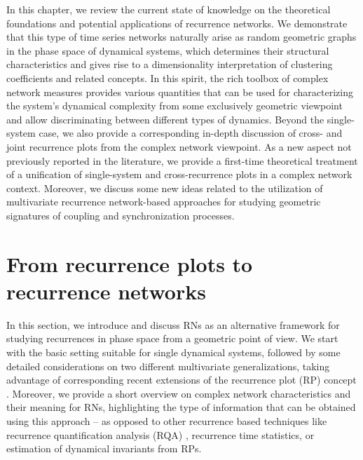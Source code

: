 \documentclass[graybox]{svmult}
\begin{document}
In this chapter, we review the current state of knowledge on the theoretical foundations and potential applications of recurrence networks. We demonstrate that this type of time series networks naturally arise as random geometric graphs in the phase space of dynamical systems, which determines their structural characteristics and gives rise to a dimensionality interpretation of clustering coefficients and related concepts. In this spirit, the rich toolbox of complex network measures \cite{Boccaletti2006,Costa2007,Newman2003} provides various quantities that can be used for characterizing the system's dynamical complexity from some exclusively geometric viewpoint and allow discriminating between different types of dynamics. Beyond the single-system case, we also provide a corresponding in-depth discussion of cross- and joint recurrence plots from the complex network viewpoint. As a new aspect not previously reported in the literature, we provide a first-time theoretical treatment of a unification of single-system and cross-recurrence plots in a complex network context. Moreover, we discuss some new ideas related to the utilization of multivariate recurrence network-based approaches for studying geometric signatures of coupling and synchronization processes.


\section{From recurrence plots to recurrence networks}\label{sec:methods}

In this section, we introduce and discuss RNs as an alternative framework for studying recurrences in phase space from a geometric point of view. We start with the basic setting suitable for single dynamical systems, followed by some detailed considerations on two different multivariate generalizations, taking advantage of corresponding recent extensions \cite{Zbilut1998,Romano2004PLA} of the recurrence plot (RP) concept \cite{Eckmann1987,marwan2007}. Moreover, we provide a short overview on complex network characteristics and their meaning for RNs, highlighting the type of information that can be obtained using this approach -- as opposed to other recurrence based techniques like recurrence quantification analysis (RQA) \cite{zbilut92,trulla96}, recurrence time statistics, or estimation of dynamical invariants from RPs.
\end{document}
